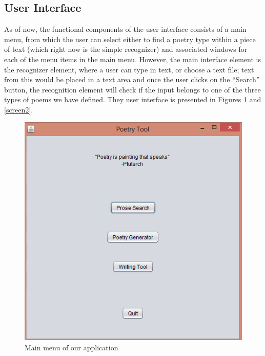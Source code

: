 \documentclass[10pt, letter]{article}
\begin{document}
\subsection*{User Interface}
As of now, the functional components of the user interface consists of a main menu, from which the user can select either to find a poetry type within a piece of text (which right now is the simple recognizer) and associated windows for each of the menu items in the main menu.
    However, the main interface element is the recognizer element, where a user can type in text, or choose a text file; text from this would be placed in a text area and once the user clicks on the “Search” button, the recognition element will check if the input belongs to one of the three types of poems we have defined. They user interface is presented in Figures \ref{screen1} and \ref{screen2}.
    
\begin{figure}[ht]
  \centering
    \includegraphics[scale=0.5]{Images/screen1}
    \caption{Main menu of our application}
  \label{screen1}
\end{figure}
\end{document}
